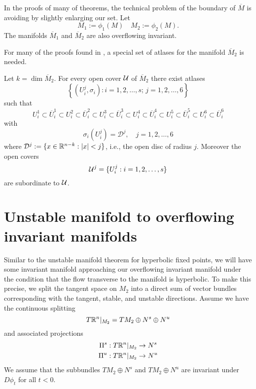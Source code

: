 In the proofs of many of theorems, the technical problem of the boundary of \(\overline M\) is avoiding by slightly enlarging our set. Let 
\begin{equation*}
	M_1 := \phi_1(M) \quad M_2 := \phi_2(M).
\end{equation*}
The manifolds \(\overline M_1\) and \(\overline M_2\) are also overflowing invariant.

For many of the proofs found in \cite{wiggins1994normally}, a special set of atlases for the manifold \(\overline M_2\) is needed. 
\begin{prop}\label{atlases}
	Let \(k = \dim \overline M_2\). For every open cover \(\mathcal{U}\) of \(\overline M_2\) there exist atlases
	\begin{equation*}
		\left\{  (U^j_i, \sigma_i) : i=1,2,\ldots, s;\, j = 1,2,\dots, 6 \right\}
	\end{equation*}
	such that
	\begin{equation*}
		U^1_i \subset \overline U^1_i  \subset U^2_i \subset \overline U^2_i  \subset U^3_i \subset \overline U^3_i  \subset U^4_i \subset \overline U^4_i  \subset U^5_i \subset \overline U^5_i  \subset U^6_i \subset \overline U^6_i  
	\end{equation*}
	with 
	\begin{equation*}
		\sigma_i(U^j_i) = \mathcal D^j, \quad j=1,2,\ldots, 6
	\end{equation*}
	where \(\mathcal D^j := \{x\in \mathbb{R}^{n-k} : |x|< j\}\), i.e., the open disc of radius \(j\). Moreover the open covers
	\begin{equation*}
		\mathcal{U}^j = \{U^j_i: i = 1,2,\ldots, s\}
	\end{equation*}
	are subordinate to \(\mathcal{U}\).
\end{prop}
\section{Unstable manifold to overflowing invariant manifolds}\label{sec:unstable-manifold}

Similar to the unstable manifold theorem for hyperbolic fixed points, we will have some invariant manifold approaching our overflowing invariant manifold under the condition that the flow transverse to the manifold is hyperbolic. To make this precise, we split the tangent space on \(M_2\) into a direct sum of vector bundles corresponding with the tangent, stable, and unstable directions. Assume we have the continuous splitting
\begin{equation*}
	T\mathbb{R}^n |_{M_2} = TM_2 \oplus N^s \oplus N^u 
\end{equation*}
and associated projections
\begin{align*}
	\Pi^s &: T\mathbb{R}^n|_{M_2} \to N^s \\
	\Pi^u &: T\mathbb{R}^n|_{M_2} \to N^u
\end{align*}
We assume that the subbundles \(TM_2 \oplus N^s\) and \(TM_2 \oplus N^u\) are invariant under \(D\phi_t\) for all \(t< 0\).

